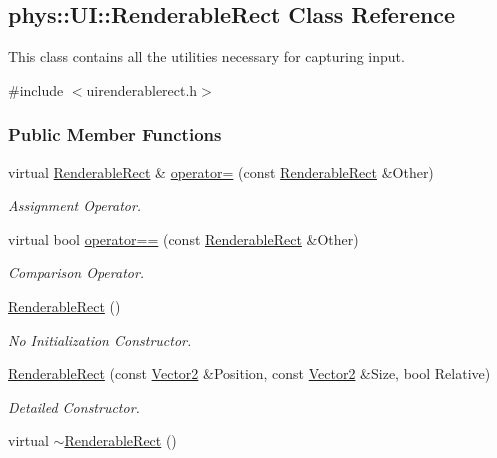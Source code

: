 \hypertarget{structphys_1_1UI_1_1RenderableRect}{
\subsection{phys::UI::RenderableRect Class Reference}
\label{structphys_1_1UI_1_1RenderableRect}
}


This class contains all the utilities necessary for capturing input.  




{\ttfamily \#include $<$uirenderablerect.h$>$}

\subsubsection*{Public Member Functions}
\begin{DoxyCompactItemize}
\item 
virtual \hyperlink{structphys_1_1UI_1_1RenderableRect}{RenderableRect} \& \hyperlink{structphys_1_1UI_1_1RenderableRect_adc996ec81f9bf70e3ab449590844fa5f}{operator=} (const \hyperlink{structphys_1_1UI_1_1RenderableRect}{RenderableRect} \&Other)
\begin{DoxyCompactList}\small\item\em Assignment Operator. \item\end{DoxyCompactList}\item 
virtual bool \hyperlink{structphys_1_1UI_1_1RenderableRect_a9ef5287e50873874eade161f9356e95d}{operator==} (const \hyperlink{structphys_1_1UI_1_1RenderableRect}{RenderableRect} \&Other)
\begin{DoxyCompactList}\small\item\em Comparison Operator. \item\end{DoxyCompactList}\item 
\hyperlink{structphys_1_1UI_1_1RenderableRect_a601c09299852b8db35b1c4d04d22b967}{RenderableRect} ()
\begin{DoxyCompactList}\small\item\em No Initialization Constructor. \item\end{DoxyCompactList}\item 
\hyperlink{structphys_1_1UI_1_1RenderableRect_aec033fdf803e921aff05b2c4fe40968d}{RenderableRect} (const \hyperlink{classphys_1_1Vector2}{Vector2} \&Position, const \hyperlink{classphys_1_1Vector2}{Vector2} \&Size, bool Relative)
\begin{DoxyCompactList}\small\item\em Detailed Constructor. \item\end{DoxyCompactList}\item 
\hypertarget{structphys_1_1UI_1_1RenderableRect_a0ee28d5ebefa8479eb54d039abe6846e}{
virtual \hyperlink{structphys_1_1UI_1_1RenderableRect_a0ee28d5ebefa8479eb54d039abe6846e}{$\sim$RenderableRect} ()}
\label{structphys_1_1UI_1_1RenderableRect_a0ee28d5ebefa8479eb54d039abe6846e}


\end{DoxyCompactItemize}

